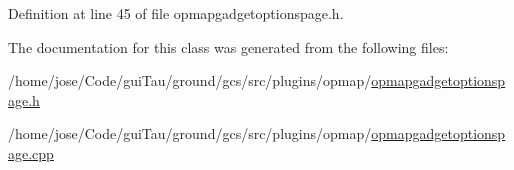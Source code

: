 Definition at line 45 of file opmapgadgetoptionspage.\-h.



The documentation for this class was generated from the following files\-:\begin{DoxyCompactItemize}
\item 
/home/jose/\-Code/gui\-Tau/ground/gcs/src/plugins/opmap/\hyperlink{opmapgadgetoptionspage_8h}{opmapgadgetoptionspage.\-h}\item 
/home/jose/\-Code/gui\-Tau/ground/gcs/src/plugins/opmap/\hyperlink{opmapgadgetoptionspage_8cpp}{opmapgadgetoptionspage.\-cpp}\end{DoxyCompactItemize}
